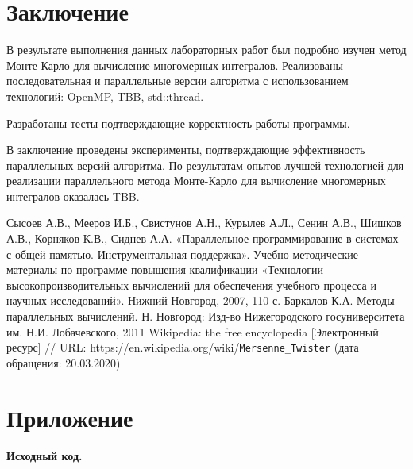 \documentclass{report}
\begin{document}
\section*{Заключение}
В результате выполнения данных лабораторных работ был подробно изучен метод Монте-Карло для вычисление многомерных интегралов.
Реализованы последовательная и параллельные версии алгоритма с использованием технологий: OpenMP, TBB, std::thread.
\par Разработаны тесты подтверждающие корректность работы программы.
\par В заключение проведены эксперименты, подтверждающие эффективность параллельных версий алгоритма. По результатам опытов лучшей технологией для реализации параллельного метода Монте-Карло для вычисление многомерных интегралов оказалась TBB.
\newpage

\begin{thebibliography}{1}
 Сысоев А.В., Мееров И.Б., Свистунов А.Н., Курылев А.Л., Сенин А.В., Шишков А.В., Корняков К.В., Сиднев А.А. «Параллельное программирование в системах с общей памятью. Инструментальная поддержка». Учебно-методические материалы по программе повышения квалификации «Технологии высокопроизводительных вычислений для обеспечения учебного процесса и научных исследований». Нижний Новгород, 2007, 110 с. 
 Баркалов К.А. Методы параллельных вычислений. Н. Новгород: Изд-во Нижегородского госуниверситета им. Н.И. Лобачевского, 2011
 Wikipedia: the free encyclopedia [Электронный ресурс] // URL: https://en.wikipedia.org/wiki/\verb|Mersenne_Twister| (дата обращения: 20.03.2020)
\end{thebibliography}
\newpage

\section*{Приложение}
\centerline{\bfseries Исходный код.} 





\end{document}
